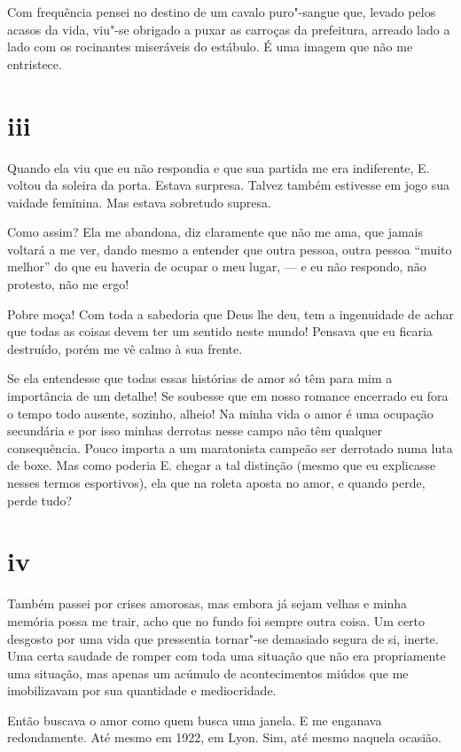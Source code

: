 Com frequência pensei no destino de um cavalo puro"-sangue que,
levado pelos acasos da vida, viu"-se obrigado a puxar as carroças da
prefeitura, arreado lado a lado com os rocinantes miseráveis do
estábulo. É uma imagem que não me entristece.

\section{iii}



Quando ela viu que eu não respondia e que sua partida me era
indiferente, E. voltou da soleira da porta. Estava surpresa. Talvez
também estivesse em jogo sua vaidade feminina. Mas
estava sobretudo supresa.

Como assim? Ela me abandona, diz claramente que não me ama, que jamais
voltará a me ver, dando mesmo a entender que outra pessoa, outra pessoa
``muito melhor'' do que eu haveria de ocupar o meu lugar, --- e eu não
respondo, não protesto, não me ergo!

Pobre moça! Com toda a sabedoria que Deus lhe deu, tem a
ingenuidade de achar que todas as coisas devem ter um sentido
neste mundo! Pensava que eu ficaria destruído, porém me vê calmo à sua
frente.

Se ela entendesse que todas essas histórias de amor só têm para mim a
importância de um detalhe! Se soubesse que em nosso romance
encerrado eu fora o tempo todo ausente, sozinho, alheio! Na minha vida
o amor é uma ocupação secundária e por isso minhas derrotas nesse
campo não têm qualquer consequência. Pouco importa a um maratonista
campeão ser derrotado numa luta de boxe. Mas como poderia E. chegar a
tal distinção (mesmo que eu explicasse nesses termos esportivos), ela
que na roleta aposta no amor, e quando perde, perde tudo?

\section{iv}

Também passei por crises amorosas, mas embora já sejam velhas e minha
memória possa me trair, acho que no fundo foi sempre outra coisa. Um
certo desgosto por uma vida que pressentia tornar"-se demasiado segura
de si, inerte. Uma certa saudade de romper com toda uma
situação que não era propriamente uma situação, mas apenas um acúmulo
de acontecimentos miúdos que me imobilizavam por sua quantidade e
mediocridade.

Então buscava o amor como quem busca uma janela. E me enganava
redondamente. Até mesmo em 1922, em Lyon. Sim, até mesmo naquela
ocasião.


